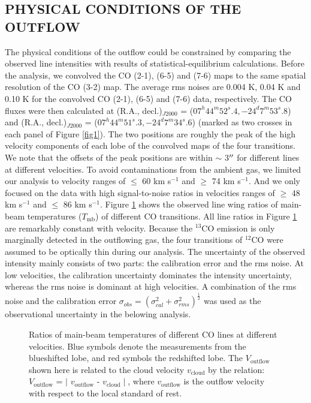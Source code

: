 \subsection{PHYSICAL CONDITIONS OF THE OUTFLOW}
The physical conditions of the outflow could be constrained by comparing the observed line intensities with results of statistical-equilibrium calculations. Before the analysis, we convolved the CO (2-1), (6-5) and (7-6) maps to the same spatial resolution of the CO (3-2) map. The average rms noises are 0.004 K, 0.04 K and 0.10 K for the convolved CO (2-1), (6-5) and (7-6) data, respectively. The CO fluxes were then calculated at (R.A., decl.)$_{J2000}$ = ($07^h44^m52^s.4, -24^d7^m53^s.8$) and (R.A., decl.)$_{J2000}$ = ($07^h44^m51^s.3, -24^d7^m34^s.6$) (marked as two crosses in each panel of Figure \ref{fig1}). The two positions are roughly the peak of the high velocity components of each lobe of the convolved maps of the four transitions. We note that the offsets of the peak positions are within $\sim$ 3$\mbox{$^{\prime\prime}$}$ for different lines at different velocities. To avoid contaminations from the ambient gas, we limited our analysis to velocity ranges of $\le$ 60 km s$^{-1}$ and $\ge$ 74 km s$^{-1}$. And we only focused on the data with high signal-to-noise ratios in velocities ranges of $\ge$ 48 km s$^{-1}$ and $\le$ 86 km s$^{-1}$. Figure \ref{fig2} shows the observed line wing ratios of main-beam temperatures ($T_{\mathrm{mb}}$) of different CO transitions.  All line ratios in Figure \ref{fig2} are remarkably constant with velocity. Because the $^{13}$CO emission is only marginally detected in the outflowing gas, the four transitions of $^{12}$CO were assumed to be optically thin during our analysis. The uncertainty of the observed intensity mainly consists of two parts: the calibration error and the rms noise. At low velocities, the calibration uncertainty dominates the intensity uncertainty, whereas the rms noise is dominant at high velocities. A combination of the rms noise and the calibration error $\sigma_{obs} = (\sigma_{cal}^2 + \sigma_{rms}^2)^{\frac{1}{2}}$ was used as the observational uncertainty in the belowing analysis.

\begin{figure}[tbp]
\caption{Ratios of main-beam temperatures of different CO lines at different velocities. Blue symbols denote the measurements from the blueshifted lobe, and red symbols the redshifted lobe. The $V_{\mathrm{outflow}}$ shown here is related to the cloud velocity $v_{\mathrm{cloud}}$ by the relation: $V_{\mathrm{outflow}}$ = $\mid$ $v_{\mathrm{outflow}}$ - $v_{\mathrm{cloud}}\mid$, where $v_{\mathrm{outflow}}$ is the outflow velocity with respect to the local standard of rest. \label{fig2}}
\end{figure}

